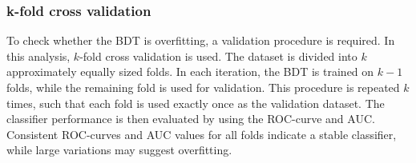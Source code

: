 \subsubsection{k-fold cross validation}
\label{sec:k-fold}
To check whether the BDT is overfitting, a validation procedure is required. In this analysis, $k$-fold cross validation is used. The dataset is divided into $k$ approximately equally sized folds. In each iteration, the BDT is trained on $k-1$ folds, while the remaining fold is used for validation. This procedure is repeated $k$ times, such that each fold is used exactly once as the validation dataset. The classifier performance is then evaluated by using the ROC-curve and AUC. Consistent ROC-curves and AUC values for all folds indicate a stable classifier, while large variations may suggest overfitting.